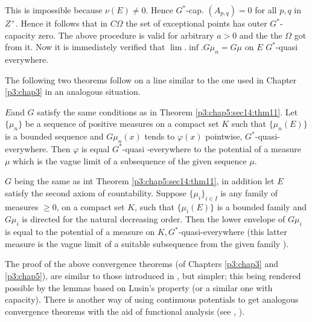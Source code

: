 This is impossible because $ \nu (E) \neq 0 $. Hence $G^*$-cap. $
(A_{p,q}) = 0 $ for all $p, q$ in $Z^+$. Hence it follows that in $C
\Omega $ the set of exceptional points  has outer $G^*$-capacity
zero. The above procedure is valid for arbitrary  $a > 0$ and the the
$ \Omega $ got from it. Now it is immediately verified that $
\lim. \inf.  G \mu_n = G \mu $ on $E$ $G^*$-quasi everywhere. 

The following two theorems follow on a line similar to the one used in
Chapter \ref{p3:chap3} in an analogous situation. 

\begin{thm}\label{p3:chap5:sec14:thm12} %
  $E$\pageoriginale and $G$ satisfy the same conditions as in Theorem
  \ref{p3:chap5:sec14:thm11}. Let $ \big
  \{\mu_n \big \} $ be a sequence of positive measures on a compact
  set $K$ such  that $ \big \{\mu_n (E) \big\} $ is a bounded sequence
  and $G \mu_n (x)$ tends to $\varphi(x)$ pointwise,
  $G^*$-quasi-everywhere. Then $\varphi$ is equal $G^*$-quasi
  -everywhere to the potential of a measure $\mu$ which is the vague
  limit of a subsequence of the given sequence $\mu$. 
\end{thm}

\begin{thm}\label{p3:chap5:sec14:thm13}%
  $G$  being the same as int Theorem \ref{p3:chap5:sec14:thm11}, in
  addition let $E$ satisfy 
  the  second axiom of countability. Suppose $ \big \{ \mu_i \big
  \}_{i \in I}$ is any family of measures  $ \geq 0 $, on a compact
  set $K$, such that $\big \{\mu_i (E) \big \}$ is a  bounded family
  and $G \mu_i$ is directed for the natural decreasing order. Then the
  lower envelope of $G \mu_i$ is equal to the potential of a measure
  on $ K, G^*$-quasi-everywhere (this latter measure is the vague
  limit of a suitable subsequence from the given family ). 
\end{thm}

\begin{remark*} 
  The proof of the above convergence theorems  (of Chapters \ref{p3:chap3} and
  \ref{p3:chap5}),  are similar to those introduced in \cite{6}, but
  simpler; this  
  being rendered possible by the lemmas based on Lusin's property (or
  a similar one with capacity). There is another way of using
  continuous potentials to get analogous convergence theorems with the
  aid of functional analysis  (see \cite{1}, \cite{2}).  
\end{remark*}
